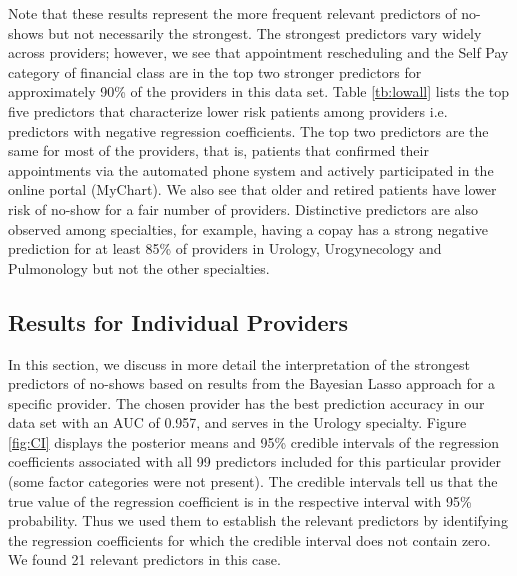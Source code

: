 \documentclass[twoside,11pt]{article}
\begin{document}
Note that these results represent the more frequent relevant predictors of no-shows but not necessarily the strongest. The strongest predictors vary widely across providers; however, we see that appointment rescheduling and the Self Pay category of financial class are in the top two stronger predictors for approximately 90\% of the providers in this data set. Table \ref{tb:lowall} lists the top five predictors that characterize lower risk patients among providers i.e. predictors with negative regression coefficients. The top two predictors are the same for most of the providers, that is, patients that confirmed their appointments via the automated phone system and actively participated in the online portal (MyChart). We also see that older and retired patients have lower risk of no-show for a fair number of providers. Distinctive predictors are also observed among specialties, for example, having a copay has a strong negative prediction for at least 85\% of providers in Urology, Urogynecology and Pulmonology but not the other specialties.

\subsection{Results for Individual Providers} 

In this section, we discuss in more detail the interpretation of the strongest predictors of no-shows based on results from the Bayesian Lasso approach for a specific provider. The chosen provider has the best prediction accuracy in our data set with an AUC of 0.957, and serves in the Urology specialty.  
Figure \ref{fig:CI} displays the posterior means and 95\% credible intervals of the regression coefficients associated with all 99 predictors included for this particular provider (some factor categories were not present). The credible intervals tell us that the true value of the regression coefficient is in the respective interval with 95\% probability. Thus we used them to establish the relevant predictors by
identifying the regression coefficients for which the credible interval does not contain zero. We found 21 relevant predictors in this case.

\vspace{-0.35cm}
\end{document}
